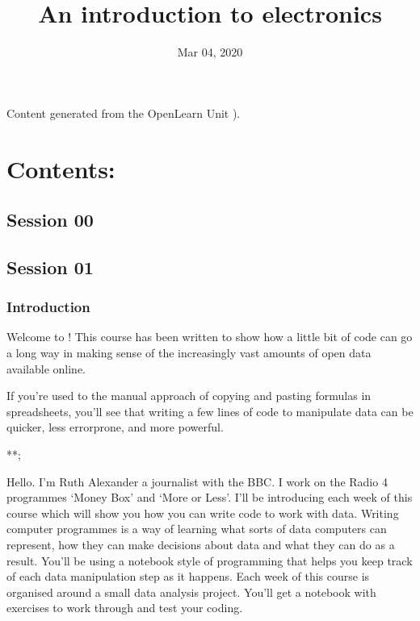 \documentclass[letterpaper,10pt,english]{sphinxmanual}
\title{An introduction to electronics}
\date{Mar 04, 2020}
\author{}
\begin{document}
\pagestyle{empty}
\sphinxmaketitle
\pagestyle{plain}
\sphinxtableofcontents
\pagestyle{normal}
\label{\detokenize{index::doc}}


Content generated from the OpenLearn Unit ).


\chapter{Contents:}
\label{\detokenize{index:contents}}

\section{Session 00}
\label{\detokenize{index:session-00}}

\section{Session 01}
\label{\detokenize{index:session-01}}

\subsection{Introduction}
\label{\detokenize{content/session_01/Part_01_01:Introduction}}\label{\detokenize{content/session_01/Part_01_01::doc}}
Welcome to ! This course has been written to show how a little bit of code can go a long way in making sense of the increasingly vast amounts of open data available online.

If you’re used to the manual approach of copying and pasting formulas in spreadsheets, you’ll see that writing a few lines of code to manipulate data can be quicker, less error\sphinxhyphen{}prone, and more powerful.








 **;

Hello. I’m Ruth Alexander a journalist with the BBC. I work on the Radio 4 programmes ‘Money Box’ and ‘More or Less’. I’ll be introducing each week of this course which will show you how you can write code to work with data. Writing computer programmes is a way of learning what sorts of data computers can represent, how they can make decisions about data and what they can do as a result. You’ll be using a notebook style of programming that helps you keep track of each data manipulation step as
it happens. Each week of this course is organised around a small data analysis project. You’ll get a notebook with exercises to work through and test your coding.
\end{document}

